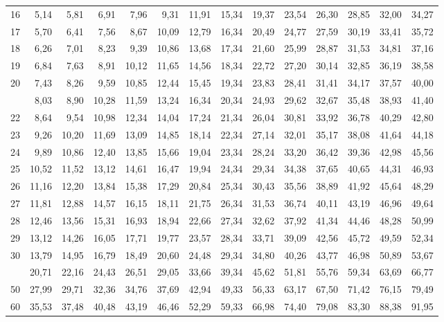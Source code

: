 \documentclass[12pt,a4paper]{article}
\begin{document}
\begin{center}
\begin{tabular*}{\linewidth}{@{\extracolsep{\fill}}rrrrrrrrrrrrrr@{}}
16 & 5,14 & 5,81 & 6,91 & 7,96 & 9,31 & 11,91 & 15,34 & 19,37 & 23,54 & 26,30 & 28,85 & 32,00 & 34,27 \\
17 & 5,70 & 6,41 & 7,56 & 8,67 & 10,09 & 12,79 & 16,34 & 20,49 & 24,77 & 27,59 & 30,19 & 33,41 & 35,72 \\
18 & 6,26 & 7,01 & 8,23 & 9,39 & 10,86 & 13,68 & 17,34 & 21,60 & 25,99 & 28,87 & 31,53 & 34,81 & 37,16 \\
19 & 6,84 & 7,63 & 8,91 & 10,12 & 11,65 & 14,56 & 18,34 & 22,72 & 27,20 & 30,14 & 32,85 & 36,19 & 38,58 \\
20 & 7,43 & 8,26 & 9,59 & 10,85 & 12,44 & 15,45 & 19,34 & 23,83 & 28,41 & 31,41 & 34,17 & 37,57 & 40,00 \\
\addlinespace[2pt]
21 & 8,03 & 8,90 & 10,28 & 11,59 & 13,24 & 16,34 & 20,34 & 24,93 & 29,62 & 32,67 & 35,48 & 38,93 & 41,40 \\
22 & 8,64 & 9,54 & 10,98 & 12,34 & 14,04 & 17,24 & 21,34 & 26,04 & 30,81 & 33,92 & 36,78 & 40,29 & 42,80 \\
23 & 9,26 & 10,20 & 11,69 & 13,09 & 14,85 & 18,14 & 22,34 & 27,14 & 32,01 & 35,17 & 38,08 & 41,64 & 44,18 \\
24 & 9,89 & 10,86 & 12,40 & 13,85 & 15,66 & 19,04 & 23,34 & 28,24 & 33,20 & 36,42 & 39,36 & 42,98 & 45,56 \\
25 & 10,52 & 11,52 & 13,12 & 14,61 & 16,47 & 19,94 & 24,34 & 29,34 & 34,38 & 37,65 & 40,65 & 44,31 & 46,93 \\
26 & 11,16 & 12,20 & 13,84 & 15,38 & 17,29 & 20,84 & 25,34 & 30,43 & 35,56 & 38,89 & 41,92 & 45,64 & 48,29 \\
27 & 11,81 & 12,88 & 14,57 & 16,15 & 18,11 & 21,75 & 26,34 & 31,53 & 36,74 & 40,11 & 43,19 & 46,96 & 49,64 \\
28 & 12,46 & 13,56 & 15,31 & 16,93 & 18,94 & 22,66 & 27,34 & 32,62 & 37,92 & 41,34 & 44,46 & 48,28 & 50,99 \\
29 & 13,12 & 14,26 & 16,05 & 17,71 & 19,77 & 23,57 & 28,34 & 33,71 & 39,09 & 42,56 & 45,72 & 49,59 & 52,34 \\
30 & 13,79 & 14,95 & 16,79 & 18,49 & 20,60 & 24,48 & 29,34 & 34,80 & 40,26 & 43,77 & 46,98 & 50,89 & 53,67 \\
\addlinespace[2pt]
40 & 20,71 & 22,16 & 24,43 & 26,51 & 29,05 & 33,66 & 39,34 & 45,62 & 51,81 & 55,76 & 59,34 & 63,69 & 66,77 \\
50 & 27,99 & 29,71 & 32,36 & 34,76 & 37,69 & 42,94 & 49,33 & 56,33 & 63,17 & 67,50 & 71,42 & 76,15 & 79,49 \\
60 & 35,53 & 37,48 & 40,48 & 43,19 & 46,46 & 52,29 & 59,33 & 66,98 & 74,40 & 79,08 & 83,30 & 88,38 & 91,95 \\

\end{tabular*}
\end{center}
\end{document}
